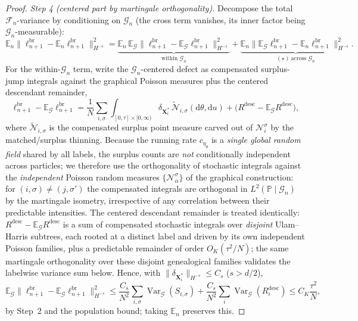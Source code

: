 \documentclass[a4paper,fleqn]{cas-sc}
\theoremstyle{definition}
\theoremstyle{remark}
\begin{document}
\begin{proof}
\emph{Step 4 (centered part by martingale orthogonality).} Decompose the total
$\mathcal F_n$-variance by conditioning on $\mathcal G_n$ (the cross term vanishes,
its inner factor being $\mathcal G_n$-measurable):
\[
\mathbb E_n\bigl\|\ell^{\mathrm{br}}_{n+1}-\mathbb E_n\ell^{\mathrm{br}}_{n+1}\bigr\|_{H^{-s}}^2
=\underbrace{\mathbb E_n\,\mathbb E_{\mathcal G}\bigl\|\ell^{\mathrm{br}}_{n+1}
-\mathbb E_{\mathcal G}\ell^{\mathrm{br}}_{n+1}\bigr\|_{H^{-s}}^2}_{\text{within }\mathcal G_n}
+\underbrace{\mathbb E_n\bigl\|\mathbb E_{\mathcal G}\ell^{\mathrm{br}}_{n+1}
-\mathbb E_n\ell^{\mathrm{br}}_{n+1}\bigr\|_{H^{-s}}^2}_{(\star)\ \text{across }\mathcal G_n}.
\]
For the within-$\mathcal G_n$ term, write the $\mathcal G_n$-centered defect as
compensated surplus-jump integrals against the graphical Poisson measures plus the
centered descendant remainder,
\[
\ell^{\mathrm{br}}_{n+1}-\mathbb E_{\mathcal G}\ell^{\mathrm{br}}_{n+1}
=\frac1N\sum_{i,\sigma}\int_{[0,\tau]\times[0,\infty)}\delta_{\mathbf X^*_i}\,
\widetilde{\mathcal N}_{i,\sigma}(\mathrm d\theta,\mathrm du)
+\bigl(R^{\mathrm{desc}}-\mathbb E_{\mathcal G}R^{\mathrm{desc}}\bigr),
\]
where $\widetilde{\mathcal N}_{i,\sigma}$ is the compensated surplus point measure
carved out of $\mathcal N^\sigma_i$ by the matched/surplus thinning. Because the
running rate $c_{\eta_\theta}$ is a \emph{single global random field} shared by all
labels, the surplus counts are \emph{not} conditionally independent across
particles; we therefore use the orthogonality of
stochastic integrals against the \emph{independent} Poisson random measures
$\{\mathcal N^\sigma_\alpha\}$ of the graphical construction: for
$(i,\sigma)\ne(j,\sigma')$ the compensated integrals are orthogonal in
$L^2(\mathbb P\mid\mathcal G_n)$ by the martingale isometry, irrespective of any
correlation between their predictable intensities. The centered descendant
remainder is treated identically:
$R^{\mathrm{desc}}-\mathbb E_{\mathcal G}R^{\mathrm{desc}}$ is a sum of compensated
stochastic integrals over \emph{disjoint} Ulam--Harris subtrees, each rooted at a
distinct label and driven by its own independent Poisson families, plus a
predictable remainder of order $O_K(\tau^2/N)$; the same martingale orthogonality
over these disjoint genealogical families validates the labelwise variance sum
below. Hence, with $\|\delta_{\mathbf X^*_i}\|_{H^{-s}}\le C_s$ ($s>d/2$),
\[
\mathbb E_{\mathcal G}\bigl\|\ell^{\mathrm{br}}_{n+1}-\mathbb E_{\mathcal G}\ell^{\mathrm{br}}_{n+1}\bigr\|_{H^{-s}}^2
\le\frac{C_s}{N^2}\sum_{i,\sigma}\operatorname{Var}_{\mathcal G}(S_{i,\sigma})
+\frac{C_s}{N^2}\sum_i\operatorname{Var}_{\mathcal G}(R^{\mathrm{desc}}_i)
\le C_K\frac{\tau^2}{N},
\]
by Step~2 and the population bound; taking $\mathbb E_n$ preserves this.


\end{proof}
\end{document}
